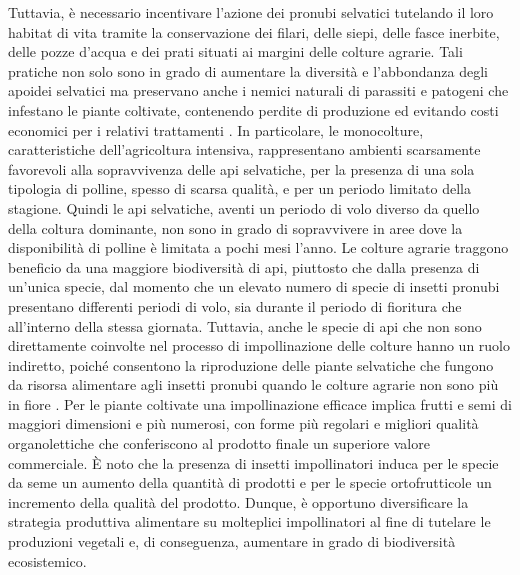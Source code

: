 \documentclass[main.tex]{subfiles}
\begin{document}
Tuttavia, è necessario incentivare l’azione dei pronubi selvatici tutelando il loro habitat di vita tramite la conservazione dei filari, delle siepi, delle fasce inerbite, delle pozze d’acqua e dei prati situati ai margini delle colture agrarie. Tali pratiche non solo sono in grado di aumentare la diversità e l’abbondanza degli apoidei selvatici ma preservano anche i nemici naturali di parassiti e patogeni che infestano le piante coltivate, contenendo perdite di produzione ed evitando costi economici per i relativi trattamenti \citep{ken}.
In particolare, le monocolture, caratteristiche dell’agricoltura intensiva, rappresentano ambienti scarsamente favorevoli alla sopravvivenza delle api selvatiche, per la presenza di una sola tipologia di polline, spesso di scarsa qualità, e per un periodo limitato della stagione.
Quindi le api selvatiche, aventi un periodo di volo diverso da quello della coltura dominante, non sono in grado di sopravvivere in aree dove la disponibilità di polline è limitata a pochi mesi l’anno. Le colture agrarie traggono beneficio da una maggiore biodiversità di api, piuttosto che dalla presenza di un’unica specie, dal momento che un elevato numero di specie di insetti pronubi presentano differenti periodi di volo, sia durante il periodo di fioritura che all’interno della stessa giornata. Tuttavia, anche le specie di api che non sono direttamente coinvolte nel processo di impollinazione delle colture hanno un ruolo indiretto, poiché consentono la riproduzione delle piante selvatiche che fungono da risorsa alimentare agli insetti pronubi quando le colture agrarie non sono più in fiore \citep{borto}.
Per le piante coltivate una impollinazione efficace implica frutti e semi di maggiori dimensioni e più numerosi, con forme più regolari e migliori qualità organolettiche che conferiscono al prodotto finale un superiore valore commerciale. È noto che la presenza di insetti impollinatori induca per le specie da seme un aumento della quantità di prodotti e per le specie ortofrutticole un incremento della qualità del prodotto.
Dunque, è opportuno diversificare la strategia produttiva alimentare su molteplici impollinatori al fine di tutelare le produzioni vegetali e, di conseguenza, aumentare in grado di biodiversità ecosistemico.
\end{document}
